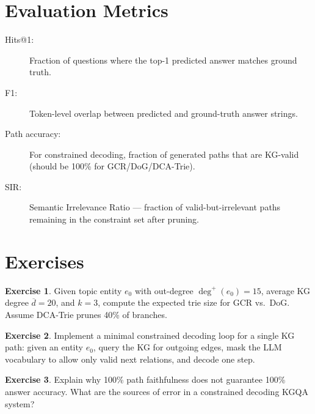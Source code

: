 \documentclass[11pt,a4paper,oneside,openany]{book}
\theoremstyle{definition}
\newtheorem{exercise}{Exercise}[chapter]
\theoremstyle{plain}
\theoremstyle{remark}
\begin{document}
\section{Evaluation Metrics}\label{sec:kgqa-eval}

\begin{description}
	\item[Hits@1:] Fraction of questions where the top-1 predicted answer matches ground truth.
	\item[F1:] Token-level overlap between predicted and ground-truth answer strings.
	\item[Path accuracy:] For constrained decoding, fraction of generated paths that are KG-valid (should be 100\% for GCR/DoG/DCA-Trie).
	\item[SIR:] Semantic Irrelevance Ratio --- fraction of valid-but-irrelevant paths remaining in the constraint set after pruning.
\end{description}

\section{Exercises}

\begin{exercise}
	Given topic entity $e_0$ with out-degree $\deg^+(e_0) = 15$, average KG degree $\overline{d} = 20$, and $k = 3$, compute the expected trie size for GCR vs.\ DoG. Assume DCA-Trie prunes 40\% of branches.
\end{exercise}

\begin{exercise}
	Implement a minimal constrained decoding loop for a single KG path: given an entity $e_0$, query the KG for outgoing edges, mask the LLM vocabulary to allow only valid next relations, and decode one step.
\end{exercise}

\begin{exercise}
	Explain why 100\% path faithfulness does not guarantee 100\% answer accuracy. What are the sources of error in a constrained decoding KGQA system?
\end{exercise}

\end{document}
